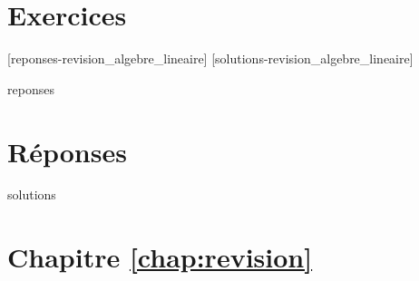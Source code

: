 \section{Exercices}
\label{chap:revision:exercices}


[reponses-revision_algebre_lineaire]
[solutions-revision_algebre_lineaire]

\begin{Filesave}{reponses}
\bigskip
\section*{Réponses}

\end{Filesave}

\begin{Filesave}{solutions}
\section*{Chapitre \ref*{chap:revision}}

\end{Filesave}


